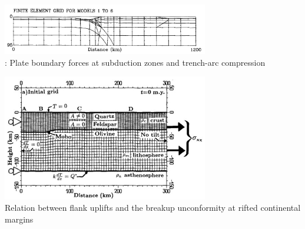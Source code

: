 \begin{center}
\begin{minipage}{0.48\textwidth}
\centering
\includegraphics[width=9cm]{images/history/boww89}\\
{: Plate boundary forces at subduction zones and trench-arc compression \cite{boww89}}
\end{minipage}\hfill
\begin{minipage}{0.45\textwidth}
\includegraphics[width=9cm]{images/history/brbe89}\\
{\captionfont Relation between flank uplifts and the breakup unconformity at rifted continental margins \cite{brbe89}}
\end{minipage}
\end{center}



